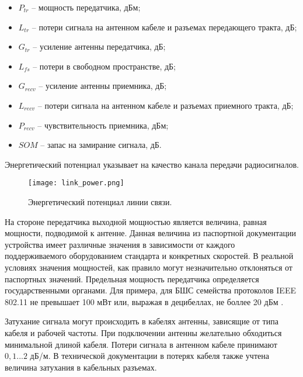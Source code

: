 \begin{itemize}

  \item $P_{tr}$ -- мощность передатчика, дБм;

  \item $L_{tr}$ -- потери сигнала на антенном кабеле и разъемах передающего тракта, дБ;

  \item $G_{tr}$ -- усиление антенны передатчика, дБ;

  \item $L_{fs}$ -- потери в свободном пространстве, дБ;

  \item $G_{recv}$ -- усиление антенны приемника, дБ;

  \item $L_{recv}$ -- потери сигнала на антенном кабеле и разъемах приемного тракта, дБ;

  \item $P_{recv}$ -- чувствительность приемника, дБм;
  
  \item $SOM$ -- запас на замирание сигнала, дБ.

\end{itemize}
Энергетический потенциал указывает на качество канала передачи радиосигналов.

\begin{figure}[h!]
  \centering
   \texttt{[image: link\_power.png]}
\caption{Энергетический потенциал линии связи.}
\label{fig:link_power}
\end{figure}

На стороне передатчика выходной мощностью является величина, равная мощности, подводимой к антенне. Данная величина из паспортной документации устройства имеет различные значения в зависимости от каждого поддерживаемого оборудованием стандарта и конкретных скоростей. В реальной условиях значения мощностей, как правило могут незначительно отклоняться от паспортных значений. Предельная мощность передатчика определяется государственными органами. Для примера, для БШС семейства протоколов IEEE 802.11 не превышает 100 мВт или, выражая в децибеллах, не боллее 20 дБм \cite{GKRCh18_13}.


Затухание сигнала могут происходить в кабелях антенны, зависящие от типа кабеля и рабочей частоты. При подключении антенны желательно обходиться минимальной длиной кабеля. Потери сигнала в антенном кабеле принимают $0, 1...2$ дБ/м. В технической документации в потерях кабеля также учтена величина затухания в кабельных разъемах. 

